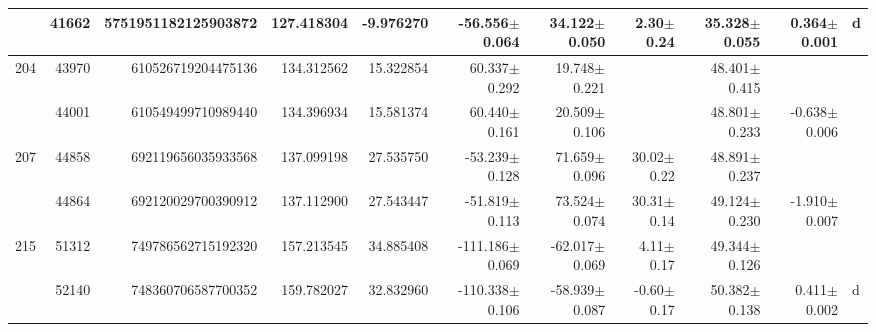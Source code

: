 \documentclass{ws-ijmpd}
\begin{document}
\begin{landscape}
\begin{longtable}{rrrrrrrrrrl}
            &   41662 &      5751951182125903872 &                   127.418304 &                    -9.976270 &                -56.556$\pm$0.064 &                 34.122$\pm$0.050 &           2.30$\pm$  0.24 &        35.328$\pm$0.055 &                           0.364$\pm$0.001 &                                                  d \\
 \hline 204 &   43970 &       610526719204475136 &                   134.312562 &                    15.322854 &                 60.337$\pm$0.292 &                 19.748$\pm$0.221 &                           &        48.401$\pm$0.415 &                                           &                                                    \\
            &   44001 &       610549499710989440 &                   134.396934 &                    15.581374 &                 60.440$\pm$0.161 &                 20.509$\pm$0.106 &                           &        48.801$\pm$0.233 &                          -0.638$\pm$0.006 &                                                    \\
 \hline 207 &   44858 &       692119656035933568 &                   137.099198 &                    27.535750 &                -53.239$\pm$0.128 &                 71.659$\pm$0.096 &          30.02$\pm$  0.22 &        48.891$\pm$0.237 &                                           &                                                    \\
            &   44864 &       692120029700390912 &                   137.112900 &                    27.543447 &                -51.819$\pm$0.113 &                 73.524$\pm$0.074 &          30.31$\pm$  0.14 &        49.124$\pm$0.230 &                          -1.910$\pm$0.007 &                                                    \\
 \hline 215 &   51312 &       749786562715192320 &                   157.213545 &                    34.885408 &               -111.186$\pm$0.069 &                -62.017$\pm$0.069 &           4.11$\pm$  0.17 &        49.344$\pm$0.126 &                                           &                                                    \\
            &   52140 &       748360706587700352 &                   159.782027 &                    32.832960 &               -110.338$\pm$0.106 &                -58.939$\pm$0.087 &          -0.60$\pm$  0.17 &        50.382$\pm$0.138 &                           0.411$\pm$0.002 &                                                  d \\

\end{longtable}
\end{landscape}
\end{document}
